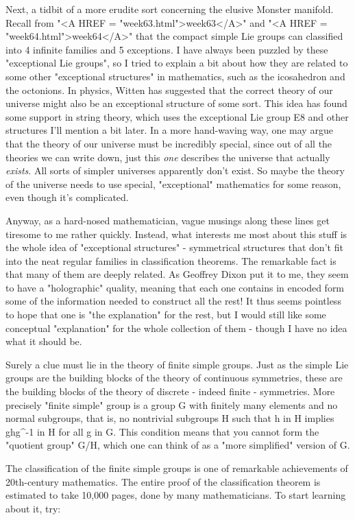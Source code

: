 Next, a tidbit of a more erudite sort concerning the elusive Monster manifold.
Recall from "<A HREF = "week63.html">week63</A>" and "<A HREF = "week64.html">week64</A>" that the compact simple Lie groups can
classified into 4 infinite families and 5 exceptions.  I have always
been puzzled by these "exceptional Lie groups", so I tried to explain a
bit about how they are related to some other "exceptional structures" in
mathematics, such as the icosahedron and the octonions.  In physics,
Witten has suggested that the correct theory of our universe might also
be an exceptional structure of some sort.  This idea has found some
support in string theory, which uses the exceptional Lie group E8 and
other structures I'll mention a bit later.  In a more hand-waving way,
one may argue that the theory of our universe must be incredibly
special, since out of all the theories we can write down, just this
\emph{one} describes the universe that actually \emph{exists}.
All sorts of simpler universes apparently don't exist.  So maybe the
theory of the universe needs to use special, "exceptional" mathematics
for some reason, even though it's complicated.

Anyway, as a hard-nosed mathematician, vague musings along these lines
get tiresome to me rather quickly.  Instead, what interests me most
about this stuff is the whole idea of "exceptional structures" -
symmetrical structures that don't fit into the neat regular families in
classification theorems.  The remarkable fact is that many of them are
deeply related.  As Geoffrey Dixon put it to me, they seem to have a
"holographic" quality, meaning that each one contains in encoded form
some of the information needed to construct all the rest!  It thus seems
pointless to hope that one is "the explanation" for the rest, but I
would still like some conceptual "explanation" for the whole collection
of them - though I have no idea what it should be.

Surely a clue must lie in the theory of finite simple groups.  Just as
the simple Lie groups are the building blocks of the theory of
continuous symmetries, these are the building blocks of the theory of
discrete - indeed finite - symmetries.  More precisely "finite simple"
group is a group G with finitely many elements and no normal
subgroups, that is, no nontrivial subgroups H such that h in H implies
ghg^{-1} in H for all g in G.  This condition means that you
cannot form the "quotient group" G/H, which one can think of as a
"more simplified" version of G.

The classification of the finite simple groups is one of remarkable
achievements of 20th-century mathematics.  The entire proof of the
classification theorem is estimated to take 10,000 pages, done by many
mathematicians.  To start learning about it, try:


